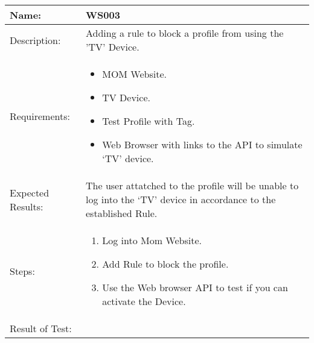 \begin{table}[h]
	\centering
		\begin{tabular*}{\textwidth}{|l|l|}
		\hline
		\hline
		Name: & WS003\\
		\hline
		Description: & Adding a rule to block a profile from using the 'TV' Device.\\
		\hline
		Requirements: & \parbox{0.85\textwidth}{
		\begin{itemize}
			\item MOM Website.
			\item TV Device.
			\item Test Profile with Tag.
			\item Web Browser with links to the API to simulate `TV' device.
		\end{itemize}}
		\\
		\hline
		Expected Results: & \parbox{.85\textwidth}{The user attatched to the profile will be unable to log into the `TV' device in accordance to the established Rule.}\\
		\hline
		Steps: & \parbox{.85\textwidth}{
		\begin{enumerate}
			\item Log into Mom Website.
			\item Add Rule to block the profile.
			\item Use the Web browser API to test if you can activate the Device.
		\end{enumerate}}
		\\		
		\hline
		Result of Test: & \\
		\hline
		\end{tabular*}
\end{table}